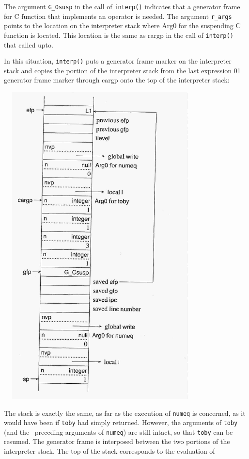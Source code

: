 The argument \texttt{G\_Osusp} in the call of \texttt{interp()}
indicates that a generator frame for C function that implements an
operator is needed. The argument \texttt{r\_args} points to the
location on the interpreter stack where Arg0 for the suspending C
function is located. This location is the same as rargp in the call of
\texttt{interp()} that called upto.

In this situation, \texttt{interp()} puts a generator frame marker on
the interpreter stack and copies the portion of the interpreter stack
from the last expression 01 generator frame marker through cargp onto
the top of the interpreter stack:

\ \  \includegraphics[width=3.848in,height=6.6035in]{ib-img/ib-img068.jpg} 

The stack is exactly the same, as far as the execution of
\texttt{numeq} is concerned, as it would have been if \texttt{toby}
had simply returned. However, the arguments of \texttt{toby} (and the
\ preceding arguments of \texttt{numeq}) are still intact, so that
\texttt{toby} can be resumed. The generator frame is interposed
between the two portions of the interpreter stack. The top of the
stack corresponds to the evaluation of

